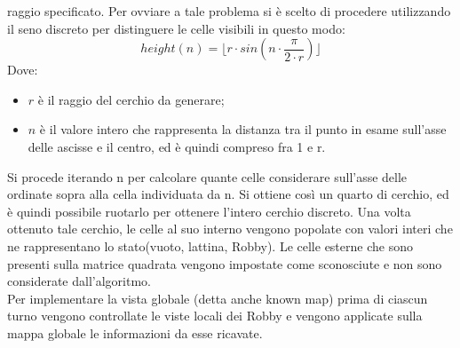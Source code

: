 raggio specificato. Per ovviare a tale problema si è scelto di procedere 
utilizzando il seno discreto per distinguere le celle visibili in questo modo:
\[height(n)=\lfloor r \cdot sin(n\cdot\frac{\pi}{2\cdot r})\rfloor \]
Dove:
\begin{itemize}
  \item $r$ è il raggio del cerchio da generare; 
  \item $n$ è il valore intero che rappresenta la distanza tra il punto in 
  esame sull'asse delle ascisse e il centro, ed è quindi compreso fra 1 e r.
\end{itemize}
Si procede iterando n per calcolare quante celle considerare sull'asse delle 
ordinate sopra alla cella individuata da n. Si ottiene così un quarto di 
cerchio, ed è quindi possibile ruotarlo per ottenere l'intero cerchio discreto.
Una volta ottenuto tale cerchio, le celle al suo interno vengono popolate con 
valori interi che ne rappresentano lo stato(vuoto, lattina, Robby). Le celle 
esterne che sono presenti sulla matrice quadrata vengono impostate come 
sconosciute e non sono considerate dall'algoritmo.
\\
Per implementare la vista globale (detta anche known map) prima di ciascun 
turno vengono controllate le viste locali dei Robby e vengono applicate sulla 
mappa globale le informazioni da esse ricavate.
